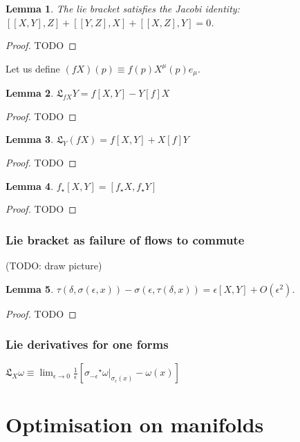 \documentclass[11pt]{book}
\newcommand{\Lie}{\ensuremath{\mathfrak{L}}}
\newcommand{\pushforward}[1]{\ensuremath{{#1}_{\star}}}
\newcommand{\pullback}[1]{\ensuremath{{#1}^{\star}}}
\newtheorem{lemma}{Lemma}
\newtheorem{proof}{Proof}
\begin{document}
\begin{lemma}
The lie bracket satisfies the Jacobi identity: $[[X, Y], Z] + [[Y, Z], X] + [[X, Z], Y] = 0$.
\end{lemma}
\begin{proof}
TODO
\end{proof}

Let us define $(fX)(p) \equiv f(p) X^\mu(p) e_\mu$.

\begin{lemma}
$\Lie_{fX}Y = f[X, Y] - Y[f]X$
\end{lemma}
\begin{proof}
TODO
\end{proof}

\begin{lemma}
$\Lie_{Y} (fX) = f[X, Y] + X[f]Y$
\end{lemma}
\begin{proof}
TODO
\end{proof}

\begin{lemma}
$\pushforward f[X, Y] = [\pushforward f X, \pushforward f Y]$
\end{lemma}
\begin{proof}
TODO
\end{proof}

\subsection{Lie bracket as failure of flows to commute}

(TODO: draw picture)

\begin{lemma}
 $\tau(\delta, \sigma(\epsilon, x)) - \sigma(\epsilon, \tau(\delta, x)) = \epsilon [X, Y] + O(\epsilon ^2)$.
\end{lemma}
\begin{proof}
TODO
\end{proof}

\subsection{Lie derivatives for one forms}

$\Lie_X \omega \equiv \lim_{\epsilon \to 0} \frac{1}{\epsilon} 
\left[
\pullback{\sigma_{-\epsilon}} \omega|_{\sigma_\epsilon(x)} - \omega(x)
\right]$

\chapter{Optimisation on manifolds}
\end{document}

